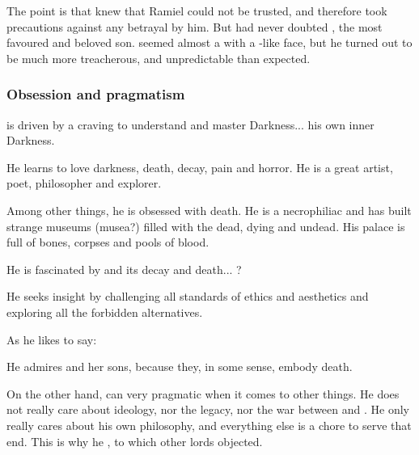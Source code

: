 The point is that \Daggerrain{} knew that Ramiel could not be trusted, and therefore took precautions against any betrayal by him. 
But \Daggerrain{} had never doubted \Azraid, the \psp{\banelords}{} most favoured and beloved son. 
\Azraid{} seemed almost a \banelord{} with a \human-like face, but he turned out to be much more treacherous, \chaotic{} and unpredictable than expected. 







\subsubsection{Obsession and pragmatism}
\Azraid{} is driven by a craving to understand and master Darkness... his own inner Darkness. 

He learns to love darkness, death, decay, pain and horror. He is a great artist, poet, philosopher and explorer.


Among other things, he is obsessed with death. 
He is a necrophiliac and has built strange museums (musea?) filled with the dead, dying and undead. 
His palace is full of bones, corpses and pools of blood. 

He is fascinated by \Erebos{} and its decay and death... ?

He seeks insight by challenging all standards of ethics and aesthetics and exploring all the forbidden alternatives.

As he likes to say: 

He admires  and her sons, because they, in some sense, embody death. 

On the other hand, \Azraid{} can very pragmatic when it comes to other things. He does not really care about ideology, nor the \bane{} legacy, nor the war between \banes{} and \dragons. He only really cares about his own philosophy, and everything else is a chore to serve that end. This is why he , to which other \resphan{} lords objected. 

